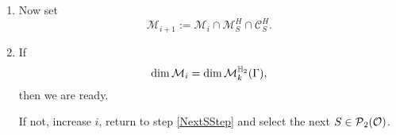 \begin{algo}
\begin{enumerate}
\item
Now set
\[ \mathcal{M}_{i+1} := \mathcal{M}_i \cap \mathcal{M}^H_S \cap \mathcal{C}^H_S . \]
%
%
%
%
%

\item
If
\[ \dim \mathcal{M}_i = \dim \operatorname{\mathcal{M}}^{\mathbb{H}_{2}}_{k} (\Gamma) , \]
then we are ready.

If not, increase $i$, return to step \ref{NextSStep} and select the next $S \in \operatorname{\mathcal{P}}_2(\mathcal{O})$.
\end{enumerate}
\end{algo}

